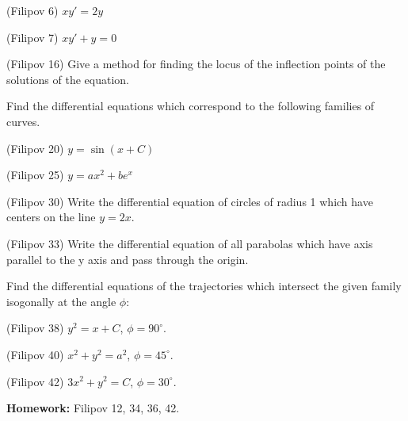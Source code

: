 \documentclass[14pt]{exam}
\begin{document}
	\begin{questions}
		\setcounter{question}{5}
		\question
		(Filipov 6) $xy' = 2y$
		
		\question
		(Filipov 7) $xy' + y = 0$
		
		\question
		(Filipov 16) Give a method for finding the locus of the inflection points of the solutions of the equation.
		
	\end{questions}
	
	Find the differential equations which correspond to the following families of curves.
	
	\begin{questions}
		\setcounter{question}{8}
		\question
		(Filipov 20) $y = \sin(x+ C)$
		
		\question
		(Filipov 25) $y = ax^2 + be^x$
		
		\question
		(Filipov 30) Write the differential equation of circles of radius 1 which have centers on the line $y = 2x$.
		
		\question
		(Filipov 33) Write the differential equation of all parabolas which have axis parallel to the y axis and pass through the origin.
	\end{questions}
	
	Find the differential equations of the trajectories which intersect the given family isogonally at the angle $\phi$:
	
	\begin{questions}
		\setcounter{question}{12}
		\question
		(Filipov 38) $y^2 = x + C$, $\phi=90^\circ$.
		
		\question
		(Filipov 40) $x^2 + y^2 = a^2$, $\phi=45^\circ$.
		
		\question
		(Filipov 42) $3x^2 + y^2 = C$, $\phi=30^\circ$.
	\end{questions}
	
	\textbf{Homework:} Filipov 12, 34, 36, 42.
\end{document}
